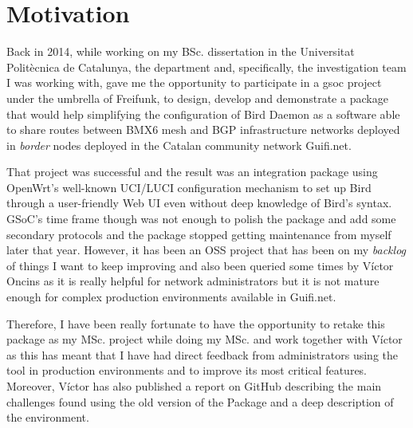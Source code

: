 
\section{Motivation}
\label{sec:motivation}
Back in 2014, while working on my BSc. dissertation in the Universitat Politècnica de Catalunya, the department and, specifically, the investigation team I was working with, gave me the opportunity to participate in a \Gls{gsoc} project under the umbrella of Freifunk, to design, develop and demonstrate a package that would help simplifying the configuration of Bird Daemon as a software able to share routes between BMX6 mesh and BGP infrastructure networks deployed in \textit{border} nodes deployed in the Catalan community network Guifi.net.

That project was successful and the result was an integration package using OpenWrt's well-known UCI/LUCI configuration mechanism to set up Bird through a user-friendly Web UI even without deep knowledge of Bird's syntax. GSoC's time frame though was not enough to polish the package and add some secondary protocols and the package stopped getting maintenance from myself later that year. However, it has been an OSS project that has been on my \textit{backlog} of things I want to keep improving and also been queried some times by Víctor Oncins as it is really helpful for network administrators but it is not mature enough for complex production environments available in Guifi.net.

Therefore, I have been really fortunate to have the opportunity to retake this package as my MSc. project while doing my MSc. and work together with Víctor as this has meant that I have had direct feedback from administrators using the tool in production environments and to improve its most critical features. Moreover, Víctor has also published a report on GitHub \cite{bgpbmx6} describing the main challenges found using the old version of the Package and a deep description of the environment.

